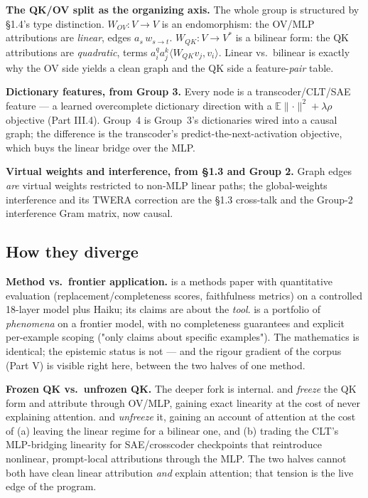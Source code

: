 \textbf{The QK/OV split as the organizing axis.} The whole group is structured by §1.4's type distinction. $W_{OV}:V\to V$ is an endomorphism: the OV/MLP attributions are \emph{linear}, edges $a_s\,w_{s\to t}$. $W_{QK}:V\to V^{*}$ is a bilinear form: the QK attributions are \emph{quadratic}, terms $a_i^q a_j^k\langle W_{QK}v_j,v_i\rangle$. Linear vs.\ bilinear is exactly why the OV side yields a clean graph and the QK side a feature-\emph{pair} table.

\textbf{Dictionary features, from Group 3.} Every node is a transcoder/CLT/SAE feature --- a learned overcomplete dictionary direction with a $\mathbb E\lVert\cdot\rVert^2+\lambda\rho$ objective (Part III.4). Group~4 is Group~3's dictionaries wired into a causal graph; the difference is the transcoder's predict-the-next-activation objective, which buys the linear bridge over the MLP.

\textbf{Virtual weights and interference, from §1.3 and Group 2.} Graph edges \emph{are} virtual weights restricted to non-MLP linear paths; the global-weights interference and its TWERA correction are the §1.3 cross-talk and the Group-2 interference Gram matrix, now causal.

\subsection*{How they diverge}

\textbf{Method vs.\ frontier application.} \textcite{circuit-tracing-computational-graphs} is a methods paper with quantitative evaluation (replacement/completeness scores, faithfulness metrics) on a controlled 18-layer model plus Haiku; its claims are about the \emph{tool}. \textcite{on-the-biology-of-a-large-language-model} is a portfolio of \emph{phenomena} on a frontier model, with no completeness guarantees and explicit per-example scoping ("only claims about specific examples"). The mathematics is identical; the epistemic status is not --- and the rigour gradient of the corpus (Part V) is visible right here, between the two halves of one method.

\textbf{Frozen QK vs.\ unfrozen QK.} The deeper fork is internal. \textcite{circuit-tracing-computational-graphs} and \textcite{on-the-biology-of-a-large-language-model} \emph{freeze} the QK form and attribute through OV/MLP, gaining exact linearity at the cost of never explaining attention. \textcite{tracing-attention-feature-interactions} and \textcite{progress-on-attention} \emph{unfreeze} it, gaining an account of attention at the cost of (a) leaving the linear regime for a bilinear one, and (b) trading the CLT's MLP-bridging linearity for SAE/crosscoder checkpoints that reintroduce nonlinear, prompt-local attributions through the MLP. The two halves cannot both have clean linear attribution \emph{and} explain attention; that tension is the live edge of the program.

